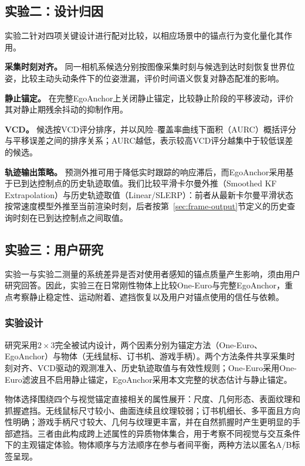\documentclass[review]{vgtc}
\begin{document}
\subsection{实验二：设计归因}\label{sec:exp2-design}

实验二针对四项关键设计进行配对比较，以相应场景中的锚点行为变化量化其作用。

\textbf{采集时刻对齐。}
同一相机系候选分别按图像采集时刻与候选到达时刻恢复世界位姿，比较主动头动条件下的位姿泄漏，评价时间语义恢复对静态配准的影响。

\textbf{静止锚定。}
在完整EgoAnchor上关闭静止锚定，比较静止阶段的平移波动，评价其对静止期残余抖动的抑制作用。

\textbf{VCD。}
候选按VCD评分排序，并以风险--覆盖率曲线下面积（AURC）概括评分与平移误差之间的排序关系；AURC越低，表示较高VCD评分越集中于较低误差的候选。

\textbf{轨迹输出策略。}
预测外推可用于降低实时跟踪的响应滞后，而EgoAnchor采用基于已到达控制点的历史轨迹取值。我们比较平滑卡尔曼外推（Smoothed KF Extrapolation）与历史轨迹取值（Linear/SLERP）：前者从最新卡尔曼平滑状态按常速度模型外推至当前渲染时刻，后者按第~\ref{sec:frame-output}节定义的历史查询时刻在已到达控制点之间取值。

\subsection{实验三：用户研究}\label{sec:exp3-design}

实验一与实验二测量的系统差异是否对使用者感知的锚点质量产生影响，须由用户研究回答。因此，实验三在日常刚性物体上比较One-Euro与完整EgoAnchor，重点考察静止稳定性、运动附着、遮挡恢复以及用户对锚点使用的信任与依赖。

\subsubsection{实验设计}

研究采用$2 \times 3$完全被试内设计，两个因素分别为锚定方法（One-Euro、EgoAnchor）与物体（无线鼠标、订书机、游戏手柄）。两个方法条件共享采集时刻对齐、VCD驱动的观测准入、历史轨迹取值与有效性规则；One-Euro采用One-Euro滤波且不启用静止锚定，EgoAnchor采用本文完整的状态估计与静止锚定。

物体选择围绕四个与视觉锚定直接相关的属性展开：尺度、几何形态、表面纹理和抓握遮挡。无线鼠标尺寸较小、曲面连续且纹理较弱；订书机细长、多平面且方向性明确；游戏手柄尺寸较大、几何与纹理更丰富，并在自然抓握时产生更明显的手部遮挡。三者由此构成跨上述属性的异质物体集合，用于考察不同视觉与交互条件下的主观锚定体验。物体顺序与方法顺序在参与者间平衡，两种方法以匿名A/B标签呈现。
\end{document}
